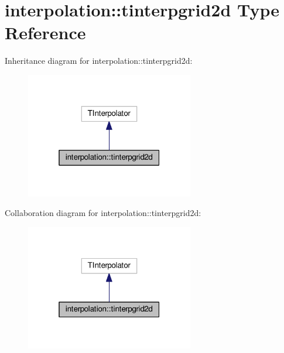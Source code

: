 \hypertarget{structinterpolation_1_1tinterpgrid2d}{}\section{interpolation\+:\+:tinterpgrid2d Type Reference}
\label{structinterpolation_1_1tinterpgrid2d}


Inheritance diagram for interpolation\+:\+:tinterpgrid2d\+:
\nopagebreak
\begin{figure}[H]
\begin{center}
\leavevmode
\includegraphics[width=208pt]{structinterpolation_1_1tinterpgrid2d__inherit__graph}
\end{center}
\end{figure}


Collaboration diagram for interpolation\+:\+:tinterpgrid2d\+:
\nopagebreak
\begin{figure}[H]
\begin{center}
\leavevmode
\includegraphics[width=208pt]{structinterpolation_1_1tinterpgrid2d__coll__graph}
\end{center}
\end{figure}
